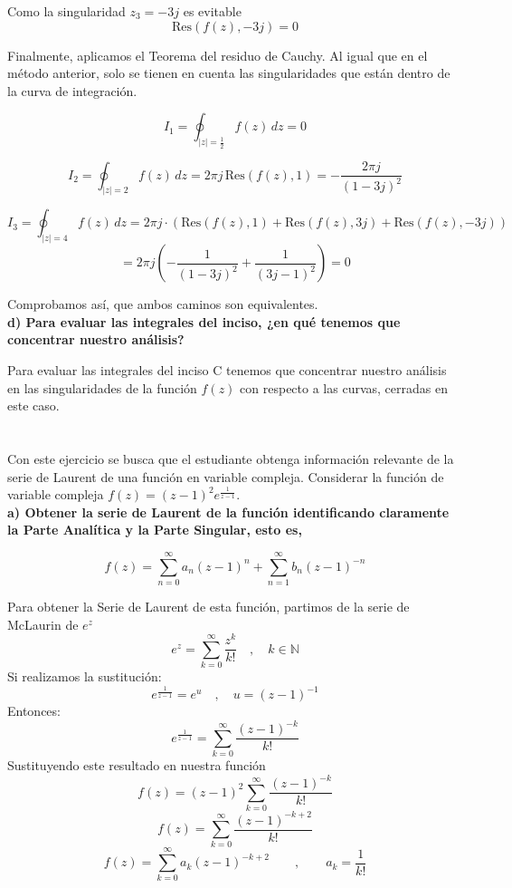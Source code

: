 \documentclass[12pt,a4paper]{report}
\begin{document}
Como la singularidad $z_3 = -3j$ es evitable $$\text{Res}(f(z),-3j)=0$$

Finalmente, aplicamos el Teorema del residuo de Cauchy. Al igual que en el método anterior, solo se tienen en cuenta las singularidades que están dentro
de la curva de integración.

$$I_1= \oint_{|z|=\frac{1}{2}}f(z) \, dz = 0 $$

$$I_2= \oint_{|z|=2}f(z) \, dz = 2 \pi j \, \text{Res}(f(z),1)= -\frac{2 \pi j}{(1-3j)^2}$$

$$I_3= \oint_{|z|=4}f(z) \, dz = 2 \pi j \cdot (\text{Res}(f(z),1)+\text{Res}(f(z),3j)+\text{Res}(f(z),-3j))$$
$$=2\pi j \left( -\frac{1}{(1-3j)^2} + \frac{1}{(3j-1)^2} \right)=0$$

Comprobamos así, que ambos caminos son equivalentes.\\

\textbf{d) Para evaluar las integrales del inciso, ¿en qué tenemos que concentrar nuestro análisis?}

Para evaluar las integrales del inciso C tenemos que concentrar nuestro análisis en las singularidades de la función $f(z)$ con respecto a las curvas,
cerradas en este caso.\\

\chapter{}%

Con este ejercicio se busca que el estudiante obtenga información relevante de la serie de Laurent de una función en variable compleja.
Considerar la función de variable compleja $ f(z) = (z - 1)^2 e^\frac{1}{z - 1} $.\\[6pt]

\textbf{a)  Obtener la serie de Laurent de la función identificando claramente la Parte Analítica y la Parte Singular, esto es,}

$$ f(z) = \sum_{n=0}^{\infty} a_n(z - 1)^n + \sum_{n=1}^{\infty} b_n(z - 1)^{-n} $$

Para obtener la Serie de Laurent de esta función, partimos de la serie de McLaurin de $e^z$
$$e^z=\sum_{k=0}^{\infty}\frac{z^k}{k!}\quad,\quad k \in \mathbb{N}$$
Si realizamos la sustitución:
$$e^\frac{1}{z - 1}=e^u \quad, \quad u=(z - 1)^{-1}$$
Entonces:
$$e^\frac{1}{z - 1}=\sum_{k=0}^{\infty}\frac{(z - 1)^{-k}}{k!}$$
Sustituyendo este resultado en nuestra función
$$f(z) = (z - 1)^2 \sum_{k=0}^{\infty}\frac{(z - 1)^{-k}}{k!}$$
$$f(z) = \sum_{k=0}^{\infty}\frac{(z - 1)^{-k+2}}{k!}$$
$$f(z) = \sum_{k=0}^{\infty}a_k(z - 1)^{-k+2}\qquad, \qquad a_k=\frac{1}{k!}$$
\end{document}
